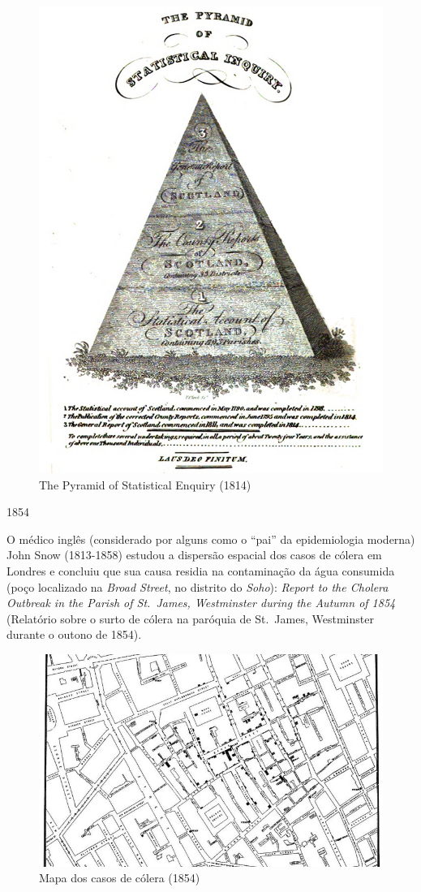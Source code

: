 \documentclass[
]{book}
\begin{document}
\begin{figure}

{\centering \includegraphics[width=0.75\linewidth]{images1/sinclair} 

}

\caption{The Pyramid of Statistical Enquiry  (1814)}\label{fig:unnamed-chunk-9}
\end{figure}

\hfill\break

1854

\hfill\break
O médico inglês (considerado por alguns como o ``pai'' da epidemiologia moderna) John Snow (1813-1858) estudou a dispersão espacial dos casos de cólera em Londres e concluiu que sua causa residia na contaminação da água consumida (poço localizado na \emph{Broad Street}, no distrito do \emph{Soho}): \emph{Report to the Cholera Outbreak in the Parish of St.~James, Westminster during the Autumn of 1854} (Relatório sobre o surto de cólera na paróquia de St.~James, Westminster durante o outono de 1854).

\hfill\break

\begin{figure}

{\centering \includegraphics[width=0.75\linewidth]{images1/london-1854-snow} 

}

\caption{Mapa dos casos de cólera (1854)}\label{fig:unnamed-chunk-10}
\end{figure}
\end{document}

